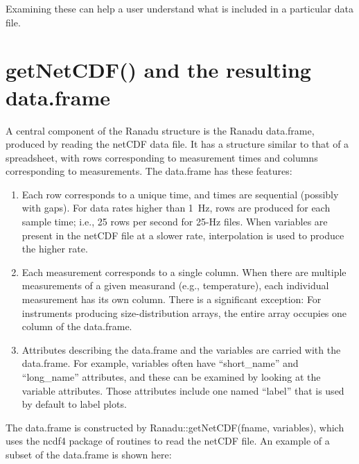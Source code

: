 \documentclass[12pt,english]{report}\usepackage[]{graphicx}\usepackage[]{color}
\begin{document}
Examining these can help a user understand what is included in a particular
data file.

\section{getNetCDF() and the resulting data.frame}

A central component of the Ranadu structure is the Ranadu data.frame,
produced by reading the netCDF data file. It has a structure similar
to that of a spreadsheet, with rows corresponding to measurement times
and columns corresponding to measurements. The data.frame has these
features:
\begin{enumerate}
\item Each row corresponds to a unique time, and times are sequential (possibly
with gaps). For data rates higher than 1~Hz, rows are produced for
each sample time; i.e., 25 rows per second for 25-Hz files. When variables
are present in the netCDF file at a slower rate, interpolation is
used to produce the higher rate.
\item Each measurement corresponds to a single column. When there are multiple
measurements of a given measurand (e.g., temperature), each individual
measurement has its own column. There is a significant exception:
For instruments producing size-distribution arrays, the entire array
occupies one column of the data.frame. 
\item Attributes describing the data.frame and the variables are carried
with the data.frame. For example, variables often have ``short\_name''
and ``long\_name'' attributes, and these can be examined by looking
at the variable attributes. Those attributes include one named ``label''
that is used by default to label plots.
\end{enumerate}
The data.frame is constructed by Ranadu::getNetCDF(fname, variables),
which uses the ncdf4 package of routines to read the netCDF file.
An example of a subset of the data.frame is shown here:

\newpage{}
\end{document}
